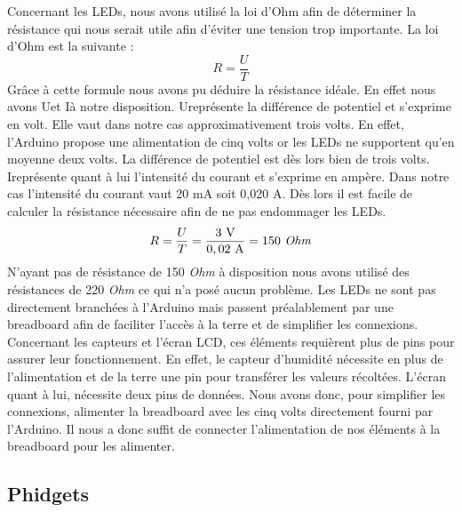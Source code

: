 Concernant les LEDs, nous avons utilisé la loi d’Ohm afin de déterminer la résistance qui nous serait utile afin d’éviter une tension trop importante. La loi d’Ohm est la suivante :
\begin{equation}
   R = \frac{U}{T}
\end{equation}
Grâce à cette formule nous avons pu déduire la résistance idéale. En effet nous avons Uet Ià notre disposition. Ureprésente la différence de potentiel et s’exprime en volt. Elle vaut dans notre cas approximativement trois volts. En effet, l’Arduino propose une alimentation de cinq volts or les LEDs ne supportent qu’en moyenne deux volts. La différence de potentiel est dès lors bien de trois volts. Ireprésente quant à lui l’intensité du courant et s’exprime en ampère. Dans notre cas l’intensité du courant vaut 20 mA soit 0,020 A. Dès lors il est facile de calculer la résistance nécessaire afin de ne pas endommager les LEDs.
\begin{equation}
   R = \frac{U}{T} = \frac{3 \mbox{ V}}{0,02 \mbox{ A}} = 150 \mbox{ \textit{Ohm}}
\end{equation}
N’ayant pas de résistance de 150 \textit{Ohm} à disposition nous avons utilisé des résistances de 220 \textit{Ohm} ce qui n’a posé aucun problème.
Les LEDs ne sont pas directement branchées à l’Arduino mais passent préalablement par une breadboard afin de faciliter l’accès à la terre et de simplifier les connexions.\\

Concernant les capteurs et l’écran LCD, ces éléments requièrent plus de pins pour assurer leur fonctionnement. En effet, le capteur d’humidité nécessite en plus de l’alimentation et de la terre une pin pour transférer les valeurs récoltées. L’écran quant à lui, nécessite deux pins de données. Nous avons donc, pour simplifier les connexions, alimenter la breadboard avec les cinq volts directement fourni par l’Arduino. Il nous a donc suffit de connecter l'alimentation de nos éléments à la breadboard pour les alimenter.


\subsection{Phidgets}

